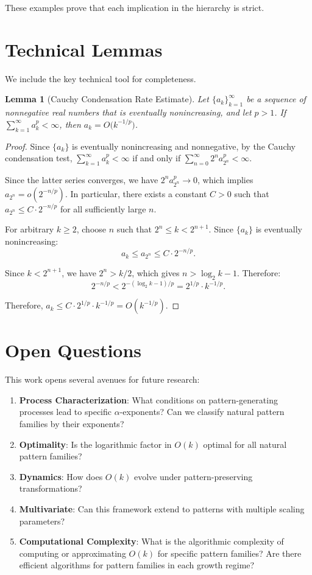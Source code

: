 \documentclass[11pt]{article}
\newtheorem{lemma}[theorem]{Lemma}
\theoremstyle{definition}
\begin{document}
These examples prove that each implication in the hierarchy is strict.


\section{Technical Lemmas}

We include the key technical tool for completeness.

\begin{lemma}[Cauchy Condensation Rate Estimate]\label{lem:dyadic}
Let $\{a_k\}_{k=1}^\infty$ be a sequence of nonnegative real numbers that is eventually nonincreasing, and let $p>1$. If $\sum_{k=1}^\infty a_k^{p}<\infty$, then $a_k=O\big(k^{-1/p}\big)$.
\end{lemma}

\begin{proof}
Since $\{a_k\}$ is eventually nonincreasing and nonnegative, by the Cauchy condensation test, $\sum_{k=1}^\infty a_k^p < \infty$ if and only if $\sum_{n=0}^\infty 2^n a_{2^n}^p < \infty$.

Since the latter series converges, we have $2^n a_{2^n}^p \to 0$, which implies $a_{2^n} = o(2^{-n/p})$. In particular, there exists a constant $C > 0$ such that $a_{2^n} \leq C \cdot 2^{-n/p}$ for all sufficiently large $n$.

For arbitrary $k \geq 2$, choose $n$ such that $2^n \leq k < 2^{n+1}$. Since $\{a_k\}$ is eventually nonincreasing:
$$a_k \leq a_{2^n} \leq C \cdot 2^{-n/p}.$$

Since $k < 2^{n+1}$, we have $2^n > k/2$, which gives $n > \log_2 k - 1$. Therefore:
$$2^{-n/p} < 2^{-(\log_2 k - 1)/p} = 2^{1/p} \cdot k^{-1/p}.$$

Therefore, $a_k \leq C \cdot 2^{1/p} \cdot k^{-1/p} = O(k^{-1/p})$.
\end{proof}

\section{Open Questions}

This work opens several avenues for future research:

\begin{enumerate}
\item \textbf{Process Characterization}: What conditions on pattern-generating processes lead to specific $\alpha$-exponents? Can we classify natural pattern families by their exponents?
\item \textbf{Optimality}: Is the logarithmic factor in $O(k)$ optimal for all natural pattern families?
\item \textbf{Dynamics}: How does $O(k)$ evolve under pattern-preserving transformations?
\item \textbf{Multivariate}: Can this framework extend to patterns with multiple scaling parameters?
\item \textbf{Computational Complexity}: What is the algorithmic complexity of computing or approximating $O(k)$ for specific pattern families? Are there efficient algorithms for pattern families in each growth regime?
\end{enumerate}
\end{document}
